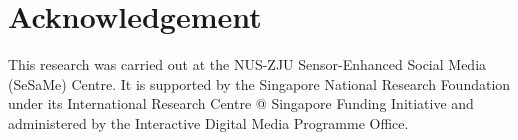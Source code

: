 \section{Acknowledgement}
\label{sec:acknowledgement}

This research was carried out at the NUS-ZJU Sensor-Enhanced Social Media (SeSaMe) Centre. 
It is supported by the Singapore National Research Foundation under its International Research Centre @ 
Singapore Funding Initiative and administered by the Interactive Digital Media Programme Office.

